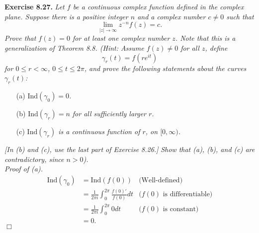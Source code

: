 \documentclass{article}
\begin{document}
\textbf{Exercise 8.27.}
\emph{Let $f$ be a continuous complex function defined in the complex plane.
Suppose there is a positive integer $n$ and a complex number $c \neq 0$ such that
\[
  \lim_{|z| \to \infty} z^{-n} f(z) = c.
\]
Prove that $f(z) = 0$ for at least one complex number $z$.
Note that this is a generalization of Theorem 8.8.
(Hint: Assume $f(z) \neq 0$ for all $z$,
define
\[
  \gamma_r(t) = f(re^{it})
\]
for $0 \leq r < \infty$, $0 \leq t \leq 2\pi$,
and prove the following statements about the curves $\gamma_r(t)$:}
\begin{enumerate}
  \item[(a)]
  \emph{$\mathrm{Ind}(\gamma_0) = 0$.}

  \item[(b)]
  \emph{$\mathrm{Ind}(\gamma_r) = n$ for all sufficiently larger $r$.}

  \item[(c)]
  \emph{$\mathrm{Ind}(\gamma_r)$ is a continuous function of $r$, on $[0,\infty)$.}
\end{enumerate}
\emph{[In (b) and (c), use the last part of Exercise 8.26.]}
\emph{Show that (a), (b), and (c) are contradictory, since $n > 0$).} \\

\emph{Proof of (a).}
\begin{align*}
  \mathrm{Ind}(\gamma_0)
  &= \mathrm{Ind}(f(0))
    &\text{(Well-defined)} \\
  &= \frac{1}{2\pi i}\int_{0}^{2\pi} \frac{f(0)'}{f(0)} dt
    &\text{($f(0)$ is differentiable)} \\
  &= \frac{1}{2\pi i}\int_{0}^{2\pi} 0 dt
    &\text{($f(0)$ is constant)} \\
  &= 0.
\end{align*}
$\Box$ \\
\end{document}
